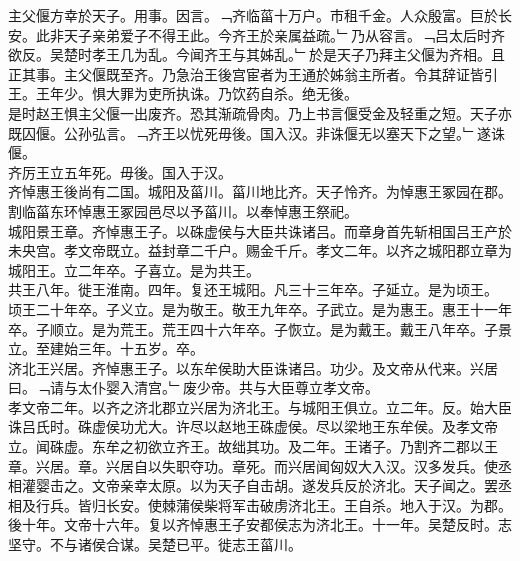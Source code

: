 \documentclass{zhvt-classic}
\begin{document}
\hspace*{2em}主父偃方幸於天子。用事。因言。﹁齐临菑十万户。市租千金。人众殷富。巨於长安。此非天子亲弟爱子不得王此。今齐王於亲属益疏。﹂乃从容言。﹁吕太后时齐欲反。吴楚时孝王几为乱。今闻齐王与其姊乱。﹂於是天子乃拜主父偃为齐相。且正其事。主父偃既至齐。乃急治王後宫宦者为王通於姊翁主所者。令其辞证皆引王。王年少。惧大罪为吏所执诛。乃饮药自杀。绝无後。\\
\hspace*{2em}是时赵王惧主父偃一出废齐。恐其渐疏骨肉。乃上书言偃受金及轻重之短。天子亦既囚偃。公孙弘言。﹁齐王以忧死毋後。国入汉。非诛偃无以塞天下之望。﹂遂诛偃。\\
\hspace*{2em}齐厉王立五年死。毋後。国入于汉。\\
\hspace*{2em}齐悼惠王後尚有二国。城阳及菑川。菑川地比齐。天子怜齐。为悼惠王冢园在郡。割临菑东环悼惠王冢园邑尽以予菑川。以奉悼惠王祭祀。\\
\hspace*{2em}城阳景王章。齐悼惠王子。以硃虚侯与大臣共诛诸吕。而章身首先斩相国吕王产於未央宫。孝文帝既立。益封章二千户。赐金千斤。孝文二年。以齐之城阳郡立章为城阳王。立二年卒。子喜立。是为共王。\\
\hspace*{2em}共王八年。徙王淮南。四年。复还王城阳。凡三十三年卒。子延立。是为顷王。\\
\hspace*{2em}顷王二十年卒。子义立。是为敬王。敬王九年卒。子武立。是为惠王。惠王十一年卒。子顺立。是为荒王。荒王四十六年卒。子恢立。是为戴王。戴王八年卒。子景立。至建始三年。十五岁。卒。\\
\hspace*{2em}济北王兴居。齐悼惠王子。以东牟侯助大臣诛诸吕。功少。及文帝从代来。兴居曰。﹁请与太仆婴入清宫。﹂废少帝。共与大臣尊立孝文帝。\\
\hspace*{2em}孝文帝二年。以齐之济北郡立兴居为济北王。与城阳王俱立。立二年。反。始大臣诛吕氏时。硃虚侯功尤大。许尽以赵地王硃虚侯。尽以梁地王东牟侯。及孝文帝立。闻硃虚。东牟之初欲立齐王。故绌其功。及二年。王诸子。乃割齐二郡以王章。兴居。章。兴居自以失职夺功。章死。而兴居闻匈奴大入汉。汉多发兵。使丞相灌婴击之。文帝亲幸太原。以为天子自击胡。遂发兵反於济北。天子闻之。罢丞相及行兵。皆归长安。使棘蒲侯柴将军击破虏济北王。王自杀。地入于汉。为郡。\\
\hspace*{2em}後十年。文帝十六年。复以齐悼惠王子安都侯志为济北王。十一年。吴楚反时。志坚守。不与诸侯合谋。吴楚已平。徙志王菑川。\\
\end{document}
